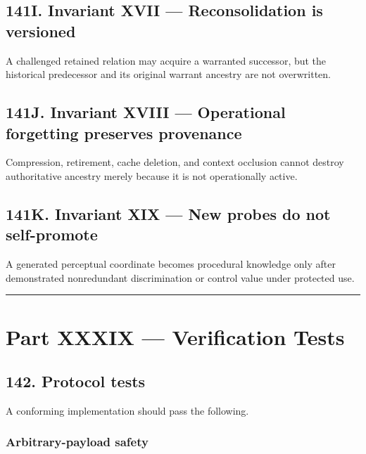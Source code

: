 \documentclass[
]{article}
\begin{document}
\subsection{141I. Invariant XVII --- Reconsolidation is versioned}\label{invariant-xvii-reconsolidation-versioned}

A challenged retained relation may acquire a warranted successor, but the
historical predecessor and its original warrant ancestry are not overwritten.

\subsection{141J. Invariant XVIII --- Operational forgetting preserves provenance}\label{invariant-xviii-operational-forgetting-preserves-provenance}

Compression, retirement, cache deletion, and context occlusion cannot destroy
authoritative ancestry merely because it is not operationally active.

\subsection{141K. Invariant XIX --- New probes do not self-promote}\label{invariant-xix-new-probes-do-not-self-promote}

A generated perceptual coordinate becomes procedural knowledge only after
demonstrated nonredundant discrimination or control value under protected use.

\begin{center}\rule{0.5\linewidth}{0.5pt}\end{center}

\section{Part XXXIX --- Verification
Tests}\label{part-xxxix-verification-tests}

\subsection{142. Protocol tests}\label{protocol-tests}

A conforming implementation should pass the following.

\subsubsection{Arbitrary-payload safety}\label{arbitrary-payload-safety}
\end{document}
